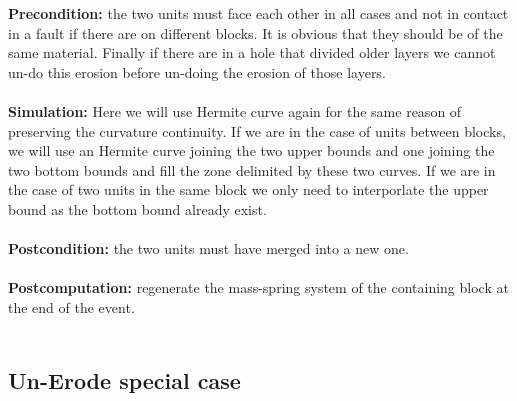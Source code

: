 \documentclass[12pt, a4paper]{report} %
\begin{document}
\textbf{Precondition:} the two units must face each other in all cases and not in contact in a fault if there are on different blocks. It is obvious that they should be of the same material. Finally if there are in a hole that divided older layers we cannot un-do this erosion before un-doing the erosion of those layers.\\\\
\textbf{Simulation:} Here we will use Hermite curve again for the same reason of preserving the curvature continuity. If we are in the case of units between blocks, we will use an Hermite curve joining the two upper bounds and one joining the two bottom bounds and fill the zone delimited by these two curves. If we are in the case of two units in the same block we only need to interporlate the upper bound as the bottom bound already exist.\\\\
\textbf{Postcondition:} the two units must have merged into a new one.\\\\
\textbf{Postcomputation:} regenerate the mass-spring system of the containing block at the end of the event.\\\\
\subsection{Un-Erode special case}
\end{document}
